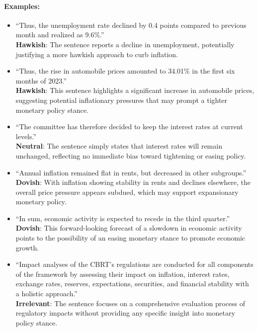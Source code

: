 \paragraph{Examples:}
\begin{itemize}
    \item ``Thus, the unemployment rate declined by 0.4 points compared to previous month and realized as 9.6\%.''\\ 
    \textbf{Hawkish}: The sentence reports a decline in unemployment, potentially justifying a more hawkish approach to curb inflation.

    \item ``Thus, the rise in automobile prices amounted to 34.01\% in the first six months of 2023.''\\ 
    \textbf{Hawkish}: This sentence highlights a significant increase in automobile prices, suggesting potential inflationary pressures that may prompt a tighter monetary policy stance.
    
    \item ``The committee has therefore decided to keep the interest rates at current levels.''\\ 
    \textbf{Neutral}: The sentence simply states that interest rates will remain unchanged, reflecting no immediate bias toward tightening or easing policy.
    
    \item ``Annual inflation remained flat in rents, but decreased in other subgroups.''\\ 
    \textbf{Dovish}: With inflation showing stability in rents and declines elsewhere, the overall price pressure appears subdued, which may support expansionary monetary policy.
    
    \item ``In sum, economic activity is expected to recede in the third quarter.''\\ 
    \textbf{Dovish}: This forward-looking forecast of a slowdown in economic activity points to the possibility of an easing monetary stance to promote economic growth.
    
    \item ``Impact analyses of the CBRT's regulations are conducted for all components of the framework by assessing their impact on inflation, interest rates, exchange rates, reserves, expectations, securities, and financial stability with a holistic approach.''\\ 
    \textbf{Irrelevant}: The sentence focuses on a comprehensive evaluation process of regulatory impacts without providing any specific insight into monetary policy stance.
\end{itemize}



